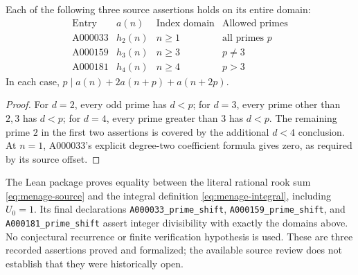 \begin{corollary}
Each of the following three source assertions holds on its entire domain:
\[
\begin{array}{c|c|c|c}
\text{Entry}&a(n)&\text{Index domain}&\text{Allowed primes}\\\hline
\mathrm{A000033}&h_2(n)&n\geq1&\text{all primes }p\\
\mathrm{A000159}&h_3(n)&n\geq3&p\ne3\\
\mathrm{A000181}&h_4(n)&n\geq4&p>3
\end{array}
\]
In each case, $p\mid a(n)+2a(n+p)+a(n+2p)$.
\end{corollary}

\begin{proof}
For $d=2$, every odd prime has $d<p$; for $d=3$, every prime other than
$2,3$ has $d<p$; for $d=4$, every prime greater than $3$ has $d<p$.
The remaining prime $2$ in the first two assertions is covered by the
additional $d<4$ conclusion. At $n=1$, A000033's explicit degree-two
coefficient formula gives zero, as required by its source offset.
\end{proof}

The Lean package proves equality between the literal rational rook sum
\eqref{eq:menage-source} and the integral definition
\eqref{eq:menage-integral}, including $U_0=1$. Its final declarations
\texttt{A000033\_prime\_shift}, \texttt{A000159\_prime\_shift}, and
\texttt{A000181\_prime\_shift} assert integer divisibility with exactly the
domains above. No conjectural recurrence or finite verification hypothesis is
used. These are three recorded assertions proved and formalized; the available
source review does not establish that they were historically open.
